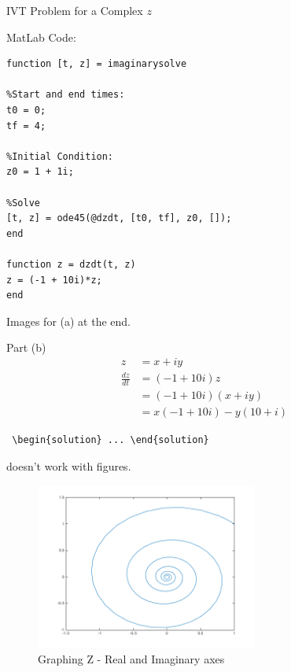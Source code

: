 \documentclass[11pt,answers]{exam}
\begin{document}
\begin{questions}
\pagebreak
\question IVT Problem for a Complex $z$

\begin{solution}
MatLab Code:
\begin{verbatim}
function [t, z] = imaginarysolve

%Start and end times:
t0 = 0;
tf = 4;

%Initial Condition:
z0 = 1 + 1i;

%Solve
[t, z] = ode45(@dzdt, [t0, tf], z0, []);
end

function z = dzdt(t, z)
z = (-1 + 10i)*z;
end
\end{verbatim}
Images for (a) at the end.

Part (b)
\begin{align*}
z & = x + iy \\
\frac{dz}{dt} &= (-1 + 10i)z \\
&= (-1 + 10i)(x + iy)\\
&= x(-1 + 10i) - y(10 + i)
\end{align*}

\end{solution}

\pagebreak

\begin{verbatim} \begin{solution} ... \end{solution} \end{verbatim} doesn't work with figures.
\begin{figure}[h]
    \centering
    \includegraphics[width = 0.65\textwidth]{zRvszi.png}
    \caption{Graphing Z - Real and Imaginary axes}
    \label{fig:my_label}
\end{figure}


\end{questions}
\end{document}
